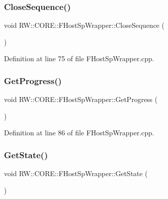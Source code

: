 \subsubsection{\texorpdfstring{Close\+Sequence()}{CloseSequence()}}
{\footnotesize\ttfamily void R\+W\+::\+C\+O\+R\+E\+::\+F\+Host\+Sp\+Wrapper\+::\+Close\+Sequence (\begin{DoxyParamCaption}{ }\end{DoxyParamCaption})}



Definition at line 75 of file F\+Host\+Sp\+Wrapper.\+cpp.

\hypertarget{class_r_w_1_1_c_o_r_e_1_1_f_host_sp_wrapper_ad586b9e7711a788688322ee7d54b0320}{}\label{class_r_w_1_1_c_o_r_e_1_1_f_host_sp_wrapper_ad586b9e7711a788688322ee7d54b0320} 
\subsubsection{\texorpdfstring{Get\+Progress()}{GetProgress()}}
{\footnotesize\ttfamily void R\+W\+::\+C\+O\+R\+E\+::\+F\+Host\+Sp\+Wrapper\+::\+Get\+Progress (\begin{DoxyParamCaption}{ }\end{DoxyParamCaption})}



Definition at line 86 of file F\+Host\+Sp\+Wrapper.\+cpp.

\hypertarget{class_r_w_1_1_c_o_r_e_1_1_f_host_sp_wrapper_ad173aae317d00608bc92d826e5befe64}{}\label{class_r_w_1_1_c_o_r_e_1_1_f_host_sp_wrapper_ad173aae317d00608bc92d826e5befe64} 
\subsubsection{\texorpdfstring{Get\+State()}{GetState()}}
{\footnotesize\ttfamily void R\+W\+::\+C\+O\+R\+E\+::\+F\+Host\+Sp\+Wrapper\+::\+Get\+State (\begin{DoxyParamCaption}{ }\end{DoxyParamCaption})}



